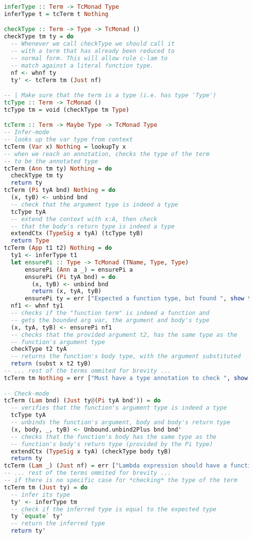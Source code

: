 \begin{lstlisting}[language=Haskell]
inferType :: Term -> TcMonad Type
inferType t = tcTerm t Nothing

checkType :: Term -> Type -> TcMonad ()
checkType tm ty = do
  -- Whenever we call checkType we should call it
  -- with a term that has already been reduced to 
  -- normal form. This will allow rule c-lam to
  -- match against a literal function type.
  nf <- whnf ty
  ty' <- tcTerm tm (Just nf)

-- | Make sure that the term is a type (i.e. has type 'Type')
tcType :: Term -> TcMonad ()
tcType tm = void (checkType tm Type)

tcTerm :: Term -> Maybe Type -> TcMonad Type
-- Infer-mode
-- looks up the var type from context
tcTerm (Var x) Nothing = lookupTy x
-- when we reach an annotation, checks the type of the term
-- to be the annotated type
tcTerm (Ann tm ty) Nothing = do
  checkType tm ty
  return ty
tcTerm (Pi tyA bnd) Nothing = do
  (x, tyB) <- unbind bnd
  -- check that the argument type is indeed a type
  tcType tyA
  -- extend the context with x:A, then check
  -- that the body's return type is indeed a type
  extendCtx (TypeSig x tyA) (tcType tyB)
  return Type
tcTerm (App t1 t2) Nothing = do
  ty1 <- inferType t1
  let ensurePi :: Type -> TcMonad (TName, Type, Type)
      ensurePi (Ann a _) = ensurePi a
      ensurePi (Pi tyA bnd) = do
        (x, tyB) <- unbind bnd
        return (x, tyA, tyB)
      ensurePi ty = err ["Expected a function type, but found ", show ty]
  nf1 <- whnf ty1
  -- checks if the "function term" is indeed a function and
  -- gets the bounded arg var, the argument and body's type
  (x, tyA, tyB) <- ensurePi nf1
  -- checks that the provided argument t2, has the same type as the
  -- function's argument type
  checkType t2 tyA
  -- returns the function's body type, with the argument substituted
  return (subst x t2 tyB)
-- ... rest of the terms ommited for brevity ...
tcTerm tm Nothing = err ["Must have a type annotation to check ", show tm]

-- Check-mode
tcTerm (Lam bnd) (Just ty@(Pi tyA bnd')) = do
  -- verifies that the function's argument type is indeed a type
  tcType tyA
  -- unbinds the function's argument, body and body's return type
  (x, body, _, tyB) <- Unbound.unbind2Plus bnd bnd'
  -- checks that the function's body has the same type as the
  -- function's body's return type (provided by the Pi type)
  extendCtx (TypeSig x tyA) (checkType body tyB)
  return ty
tcTerm (Lam _) (Just nf) = err ["Lambda expression should have a function type, not", show nf]
-- ... rest of the terms ommited for brevity ...
-- if there is no specific case for *checking* the type of the term
tcTerm tm (Just ty) = do
  -- infer its type
  ty' <- inferType tm
  -- check if the inferred type is equal to the expected type
  ty `equate` ty'
  -- return the inferred type
  return ty'
\end{lstlisting}

